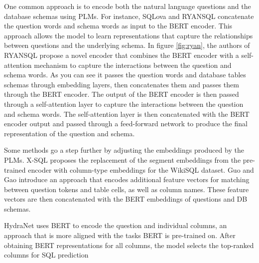 One common approach is to encode both the natural language questions and the database schemas using PLMs. For instance, SQLova\cite{DBLP:journals/corr/abs-1902-01069} and RYANSQL\cite{10.1162/coli_a_00403} concatenate the question words and schema words as input to the BERT encoder. This approach allows the model to learn representations that capture the relationships between questions and the underlying schema. In figure \ref{fig:ryan}, the authors of RYANSQL\cite{10.1162/coli_a_00403} propose a novel encoder that combines the BERT encoder with a self-attention mechanism to capture the interactions between the question and schema words. As you can see it passes the question words and database tables schemas through embedding layers, then concatenates them and passes them through the BERT encoder. The output of the BERT encoder is then passed through a self-attention layer to capture the interactions between the question and schema words. The self-attention layer is then concatenated with the BERT encoder output and passed through a feed-forward network to produce the final representation of the question and schema.

Some methods go a step further by adjusting the embeddings produced by the PLMs. X-SQL\cite{he2019xsql} proposes the replacement of the segment embeddings from the pre-trained encoder with column-type embeddings for the WikiSQL dataset. Guo and Gao \cite{guo2020content} introduce an approach that encodes additional feature vectors for matching between question tokens and table cells, as well as column names. These feature vectors are then concatenated with the BERT embeddings of questions and DB schemas.

HydraNet\cite{lyu_hybrid_2020} uses BERT to encode the question and individual columns, an approach that is more aligned with the tasks BERT is pre-trained on. After obtaining BERT representations for all columns, the model selects the top-ranked columns for SQL prediction


\begin{table}[H]
    \centering
    \caption{The execution accuracy on the WikiSQL dev set.}
    \label{table:methods:encoders:adaptplm}
\end{table}


